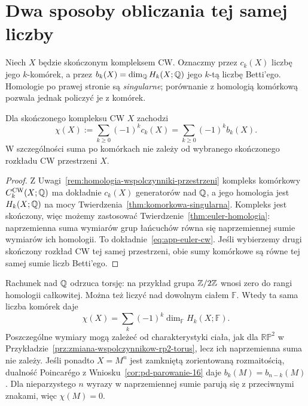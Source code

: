 \section{Dwa sposoby obliczania tej samej liczby}
\label{sec:app-euler-dwa-rachunki}

Niech $X$ będzie skończonym kompleksem CW. Oznaczmy przez $c_k(X)$
liczbę jego $k$-komórek, a przez
$b_k(X)=\dim_{\mathbb{Q}}H_k(X;\mathbb{Q})$ jego $k$-tą liczbę Betti'ego.
Homologie po prawej stronie są \emph{singularne}; porównanie
z homologią komórkową pozwala jednak policzyć je z komórek.

\begin{stwierdzenie}
\label{prop:app-euler-cw}
Dla skończonego kompleksu CW $X$ zachodzi
\begin{equation}\label{eq:app-euler-cw}
 \chi(X):=\sum_{k\geq0}(-1)^k c_k(X)
 =\sum_{k\geq0}(-1)^k b_k(X).
\end{equation}
W szczególności suma po komórkach nie zależy od wybranego skończonego
rozkładu CW przestrzeni $X$.
\end{stwierdzenie}
\begin{proof}
Z Uwagi~\ref{rem:homologia-wspolczynniki-przestrzeni} kompleks
komórkowy $C_k^{\mathrm{CW}}(X;\mathbb{Q})$ ma dokładnie $c_k(X)$ generatorów
nad $\mathbb{Q}$, a jego homologia jest $H_k(X;\mathbb{Q})$ na mocy
Twierdzenia~\ref{thm:komorkowa-singularna}. Kompleks jest skończony,
więc możemy zastosować Twierdzenie~\ref{thm:euler-homologia}:
naprzemienna suma wymiarów grup łańcuchów równa się naprzemiennej
sumie wymiarów ich homologii. To dokładnie~\eqref{eq:app-euler-cw}.
Jeśli wybierzemy drugi skończony rozkład CW tej samej przestrzeni,
obie sumy komórkowe są równe tej samej sumie liczb Betti'ego.
\end{proof}

Rachunek nad $\mathbb{Q}$ odrzuca torsję: na przykład grupa $\mathbb{Z}/2\mathbb{Z}$
wnosi zero do rangi homologii całkowitej. Można też liczyć nad dowolnym
ciałem $\mathbb F$. Wtedy ta sama liczba komórek daje
\begin{equation}\label{eq:app-euler-cialo}
 \chi(X)=\sum_k(-1)^k\dim_{\mathbb F}H_k(X;\mathbb F).
\end{equation}
Poszczególne wymiary mogą zależeć od charakterystyki ciała,
jak dla $\mathbb{RP}^2$ w Przykładzie~\ref{prz:zmiana-wspolczynnikow-rp2-torus},
lecz ich naprzemienna suma nie zależy.
Jeśli ponadto $X=M^n$ jest zamkniętą zorientowaną
rozmaitością, dualność Poincarégo z
Wniosku~\ref{cor:pd-parowanie-16} daje
$b_k(M)=b_{n-k}(M)$. Dla nieparzystego $n$ wyrazy
w naprzemiennej sumie parują się z przeciwnymi znakami,
więc $\chi(M)=0$.

